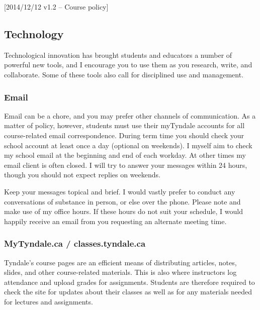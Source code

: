 [2014/12/12 v1.2 -- Course policy]

\subsection{Technology}
\label{technology}

Technological innovation has brought students and educators a number of
powerful new tools, and I encourage you to use them as you research, write, and
collaborate. Some of these tools also call for disciplined use and management.

\subsubsection{Email}
\label{email}

Email can be a chore, and you may prefer other channels of communication. As a
matter of policy, however, students must use their myTyndale accounts for all
course-related email correspondence. During term time you should check your
school account at least once a day (optional on weekends). I myself aim to
check my school email at the beginning and end of each workday. At other times
my email client is often closed. I will try to answer your messages within 24
hours, though you should not expect replies on weekends.

Keep your messages topical and brief. I would vastly prefer to conduct any
conversations of substance in person, or else over the phone. Please note and
make use of my office hours. If these hours do not suit your schedule, I would
happily receive an email from you requesting an alternate meeting time.


\subsubsection{MyTyndale.ca / classes.tyndale.ca}
\label{mytyndale}

Tyndale's course pages are an efficient means of distributing articles, notes,
slides, and other course-related materials. This is also where instructors log
attendance and upload grades for assignments. Students are therefore required to
check the site for updates about their classes as well as for any materials
needed for lectures and assignments.

